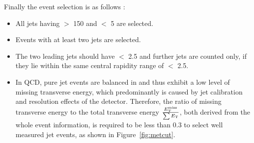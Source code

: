 Finally the event selection is as follows : 

\begin{itemize}
\item All jets having \pt $>$ 150 \GeV and  $<$ 5 are selected.
\item Events with at least two jets are selected.
\item The two leading jets should have  $<$ 2.5 and further jets are counted only, if they lie within the same central rapidity range of  $<$ 2.5.
\item In QCD, pure jet events are balanced in \pt and thus exhibit a low level of missing transverse energy, which predominantly is caused 
  by jet calibration and resolution effects of the detector. Therefore, the ratio of missing transverse energy to the total transverse energy
  $\frac{\ETmiss}{\sum \ET}$, both derived from the whole event information, is required to be less than 0.3 to select well measured
  jet events, as shown in Figure~\ref{fig:metcut}. 
\end{itemize}

